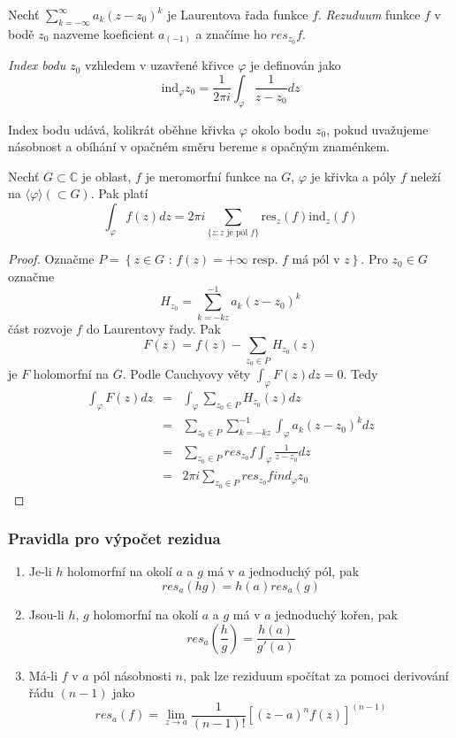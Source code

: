 \begin{definice}
Nechť $\sum_{k =- \infty}^\infty a_k ( z-z_0)^k$ je Laurentova řada funkce $f$. \emph{Rezuduum} funkce $f$ v bodě $z_0$ nazveme koeficient $a_{(-1)}$ a značíme ho $res_{z_0} f$.
\end{definice}

\begin{definice}
\emph{Index bodu $z_0$} vzhledem v uzavřené křivce $\varphi$ je definován jako
$$\mathrm{ind}_\varphi z_0 = \frac{1}{2 \pi i} \int_\varphi \frac{1}{z-z_0}dz$$
\end{definice}

Index bodu udává, kolikrát oběhne křivka $\varphi$ okolo bodu $z_0$, pokud uvažujeme násobnost a obíhání v opačném směru bereme s opačným znaménkem.

\begin{vetat}
Nechť $G \subset \mathbb{C}$ je oblast, $f$ je meromorfní funkce na $G$, $\varphi$ je křivka a póly $f$ neleží na $\langle \varphi \rangle (\subset G)$. Pak platí
$$\int_\varphi f(z) dz = 2 \pi i \sum_{\{z: z \textrm{ je pól } f\}} \mathrm{res}_z (f) \mathrm{ind}_z (f)$$
\end{vetat}

\begin{proof}
Označme $P = \left\{ z \in G \textrm{ : } f(z)=+\infty \textrm{ resp. $f$ má pól v $z$} \right\}$. 
Pro $z_0 \in G$ označme 
$$H_{z_0} = \sum_{k = -kz}^{-1} a_k (z-z_0)^k$$ 
část rozvoje $f$ do Laurentovy řady.
Pak $$F(z) = f(z) - \sum_{z_0 \in P} H_{z_0}(z)$$ je $F$ holomorfní na $G$.
Podle Cauchyovy věty $\int_\varphi F(z) dz = 0$. Tedy
\begin{eqnarray*}
\int_\varphi F(z) dz & = & \int_\varphi \sum_{z_0 \in P} H_{z_0}(z) dz \\
& = & \sum_{z_0 \in P} \sum_{k=-kz}^{-1} \int_\varphi a_k (z-z_0)^k dz \\
& = & \sum_{z_0 \in P} res_{z_0} f \int_\varphi \frac{1}{z-z_0} dz \\
& = & 2 \pi i \sum_{z_0 \in P} res_{z_0} f ind_\varphi z_0 
\end{eqnarray*}
\end{proof}

\subsubsection*{Pravidla pro výpočet rezidua}

\begin{enumerate}
\item Je-li $h$ holomorfní na okolí $a$ a $g$ má v $a$ jednoduchý pól, pak
$$res_a(hg) = h(a) res_a (g)$$
\item Jsou-li $h$, $g$ holomorfní na okolí $a$ a $g$ má v $a$ jednoduchý kořen, pak 
$$res_a \left( \frac{h}{g} \right) = \frac{h(a)}{g \prime (a)}$$
\item Má-li $f$ v $a$ pól násobnosti $n$, pak lze reziduum spočítat za pomoci derivování řádu $(n-1)$ jako
$$res_a(f) = \lim_{z \rightarrow a} \frac{1}{(n-1)!} \left[ (z-a)^n f(z) \right]^{(n-1)}$$
\end{enumerate}

